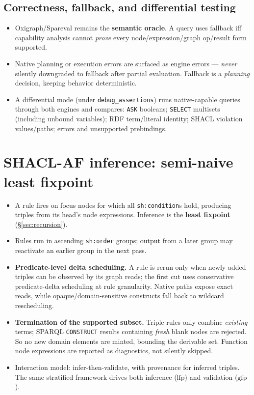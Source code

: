 \documentclass[11pt]{article}
\newcommand{\lfp}{\mathrm{lfp}}
\newcommand{\gfp}{\mathrm{gfp}}
\newcommand{\code}[1]{\texttt{#1}}
\theoremstyle{definition}
\begin{document}
\subsection{Correctness, fallback, and differential testing}
\begin{itemize}[leftmargin=1.4em]
  \item Oxigraph/Spareval remains the \textbf{semantic oracle}. A query uses
  fallback iff capability analysis cannot \emph{prove} every node/expression/graph
  op/result form supported.
  \item Native planning or execution errors are surfaced as engine errors ---
  \emph{never} silently downgraded to fallback after partial evaluation. Fallback
  is a \emph{planning} decision, keeping behavior deterministic.
  \item A differential mode (under \code{debug\_assertions}) runs native-capable
  queries through both engines and compares: \code{ASK} booleans; \code{SELECT}
  multisets (including unbound variables); RDF term/literal identity; SHACL
  violation values/paths; errors and unsupported prebindings.
\end{itemize}

\section{SHACL-AF inference: semi-naive least fixpoint}\label{sec:infer}

\begin{itemize}[leftmargin=1.4em]
  \item A rule fires on focus nodes for which all \code{sh:condition}s hold,
  producing triples from its head's node expressions. Inference is the
  \textbf{least fixpoint} (\S\ref{sec:recursion}).
  \item Rules run in ascending \code{sh:order} groups; output from a later group
  may reactivate an earlier group in the next pass.
  \item \textbf{Predicate-level delta scheduling.} A rule is rerun only when newly
  added triples can be observed by its graph reads; the first cut uses
  conservative predicate-delta scheduling at rule granularity. Native paths
  expose exact reads, while opaque/domain-sensitive constructs fall back to
  wildcard rescheduling.
  \item \textbf{Termination of the supported subset.} Triple rules only combine
  \emph{existing} terms; SPARQL \code{CONSTRUCT} results containing \emph{fresh}
  blank nodes are rejected. So no new domain elements are minted, bounding the
  derivable set. Function node expressions are reported as diagnostics, not
  silently skipped.
  \item Interaction model: infer-then-validate, with provenance for inferred
  triples. The same stratified framework drives both inference ($\lfp$) and
  validation ($\gfp$).
\end{itemize}
\end{document}
